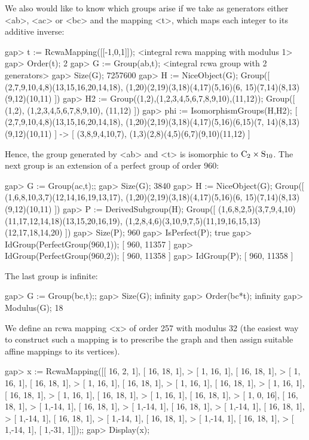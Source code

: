 We also would like to know which groups arise if we take as generators
either <ab>, <ac> or <bc> and the mapping <t>, which maps each integer
to its additive inverse:

\beginexample
gap> t := RcwaMapping([[-1,0,1]]);
<integral rcwa mapping with modulus 1>
gap> Order(t);
2
gap> G := Group(ab,t);
<integral rcwa group with 2 generators>
gap> Size(G);
7257600
gap> H := NiceObject(G);
Group([ (2,7,9,10,4,8)(13,15,16,20,14,18), (1,20)(2,19)(3,18)(4,17)(5,16)(6,
    15)(7,14)(8,13)(9,12)(10,11) ])
gap> H2 := Group((1,2),(1,2,3,4,5,6,7,8,9,10),(11,12));
Group([ (1,2), (1,2,3,4,5,6,7,8,9,10), (11,12) ])
gap> phi := IsomorphismGroups(H,H2);
[ (2,7,9,10,4,8)(13,15,16,20,14,18), (1,20)(2,19)(3,18)(4,17)(5,16)(6,15)(7,
    14)(8,13)(9,12)(10,11) ] ->
[ (3,8,9,4,10,7), (1,3)(2,8)(4,5)(6,7)(9,10)(11,12) ]
\endexample

Hence, the group generated by <ab> and <t> is isomorphic to 
${\rm C}_2 \times {\rm S}_{10}$.
The next group is an extension of a perfect group of order 960:

\beginexample
gap> G := Group(ac,t);;
gap> Size(G);
3840
gap> H := NiceObject(G);
Group([ (1,6,8,10,3,7)(12,14,16,19,13,17), (1,20)(2,19)(3,18)(4,17)(5,16)(6,
    15)(7,14)(8,13)(9,12)(10,11) ])
gap> P := DerivedSubgroup(H);
Group([ (1,6,8,2,5)(3,7,9,4,10)(11,17,12,14,18)(13,15,20,16,19),
  (1,2,8,4,6)(3,10,9,7,5)(11,19,16,15,13)(12,17,18,14,20) ])
gap> Size(P);
960
gap> IsPerfect(P);
true
gap> IdGroup(PerfectGroup(960,1));
[ 960, 11357 ]
gap> IdGroup(PerfectGroup(960,2));
[ 960, 11358 ]
gap> IdGroup(P);
[ 960, 11358 ]
\endexample

The last group is infinite:

\beginexample
gap> G := Group(bc,t);;
gap> Size(G);
infinity
gap> Order(bc*t);
infinity
gap> Modulus(G);
18
\endexample


We define an rcwa mapping <x> of order 257 with modulus 32
(the easiest way to construct such a mapping is to prescribe the
graph and then assign suitable affine mappings to its vertices).

\beginexample
gap> x := RcwaMapping([[ 16,  2,  1], [ 16, 18,  1],
>                      [  1, 16,  1], [ 16, 18,  1],
>                      [  1, 16,  1], [ 16, 18,  1],
>                      [  1, 16,  1], [ 16, 18,  1],
>                      [  1, 16,  1], [ 16, 18,  1],
>                      [  1, 16,  1], [ 16, 18,  1],
>                      [  1, 16,  1], [ 16, 18,  1],
>                      [  1, 16,  1], [ 16, 18,  1],
>                      [  1,  0, 16], [ 16, 18,  1],
>                      [  1,-14,  1], [ 16, 18,  1],
>                      [  1,-14,  1], [ 16, 18,  1],
>                      [  1,-14,  1], [ 16, 18,  1],
>                      [  1,-14,  1], [ 16, 18,  1],
>                      [  1,-14,  1], [ 16, 18,  1],
>                      [  1,-14,  1], [ 16, 18,  1],
>                      [  1,-14,  1], [  1,-31,  1]]);;
gap> Display(x);


